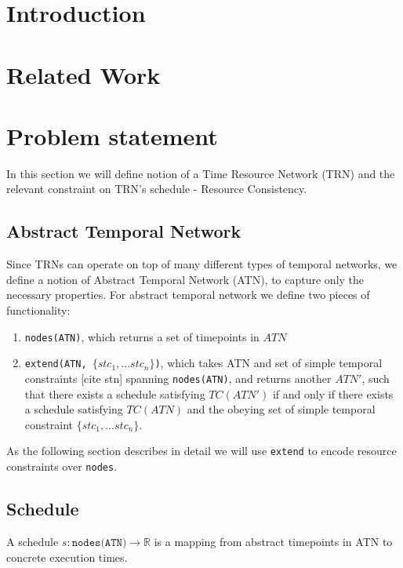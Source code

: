 \documentclass{article}
\begin{document}
\begin{multicols}{2}
\begin{abstract}
\noindent \blindtext
\end{abstract}
\section{Introduction}
\blindtext[5]

\section{Related Work}
\blindtext[5]

\section{Problem statement}
In this section we will define notion of a Time Resource Network (TRN) and the relevant constraint on TRN's schedule - Resource Consistency.
\subsection{Abstract Temporal Network}
Since TRNs can operate on top of many different types of temporal networks, we define a notion of Abstract Temporal Network (ATN), to capture only the necessary properties. For abstract temporal network we define two pieces of functionality:
\begin{enumerate}
\item \texttt{nodes(ATN)}, which returns a set of timepoints in $ATN$
\item \texttt{extend(ATN, $\{ stc_1, ... stc_n \} $)}, which takes ATN and set of simple temporal constraints [cite stn] spanning \texttt{nodes(ATN)}, and returns another $ATN'$, such that there exists a schedule satisfying $TC(ATN')$ if and only if there exists a schedule satisfying $TC(ATN)$ and the obeying set of simple temporal constraint $\{ stc_1, ... stc_n \} $.
\end{enumerate}
As the following section describes in detail we will use \texttt{extend} to encode resource constraints over \texttt{nodes}.
\subsection{Schedule}
A schedule $s: \texttt{nodes(ATN)} \rightarrow \mathbb{R}$ is a mapping from abstract timepoints in ATN to concrete execution times.

\end{multicols}
\end{document}
